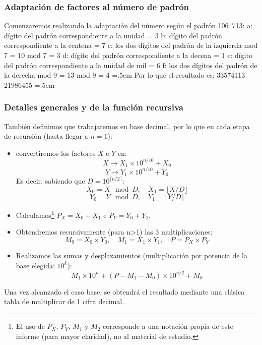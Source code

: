 \documentclass[titlepage,a4paper]{article}
\newenvironment{lcverbatim}
 {\SaveVerbatim{cverb}}
 {\endSaveVerbatim
  \flushleft\fboxrule=0pt\fboxsep=.5em
  \colorbox{cverbbg}{%
    \makebox[\dimexpr\linewidth-2\fboxsep][l]{\BUseVerbatim{cverb}}%
  }
  \endflushleft
}
\begin{document}
\subsubsection{Adaptación de factores al número de padrón}
Comenzaremos realizando la adaptación del número según el padrón 106~713:
\begin{lcverbatim}
    a: dígito del padrón correspondiente a la unidad = 3
    b: dígito del padrón correspondiente a la centena = 7
    c: los dos dígitos del padrón de la izquierda mod 7 = 10 mod 7 = 3
    d: dígito del padrón correspondiente a la decena = 1
    e: dígito del padrón correspondiente a la unidad de mil = 6
    f: los dos dígitos del padrón de la derecha mod 9 = 13 mod 9 = 4
\end{lcverbatim}
Por lo que el resultado es:
\begin{lcverbatim}
    33574113 
    21986455
\end{lcverbatim}
\subsubsection{Detalles generales y  de la función recursiva}
También definimos que trabajaremos en base decimal, por lo que en cada etapa de recursión (hasta llegar a $n=1$):
\begin{itemize}
    \item convertiremos los factores $X$ e $Y$ en:
    $$X \rightarrow X_1\times 10^{n/10}+X_0$$
    $$Y \rightarrow Y_1\times 10^{n/10}+Y_0$$
    Es decir, sabiendo que $D = 10^{\lceil n/2\rceil}$:
    $$X_0 = X \mod D, \quad X_1 = \lfloor X / D \rfloor$$
    $$Y_0 = Y \mod D, \quad Y_1 = \lfloor Y / D \rfloor$$
    \item Calculamos\footnote{El uso de $P_X$, $P_Y$, $M_1$ y $M_2$ corresponde a una notación propia de este informe (para mayor claridad), no al material de estudio.} $P_X=X_0+X_1$ e $P_Y=Y_0+Y_1$.
    \item Obtendremos recursivamente (para n>1) las 3 multiplicaciones\footnotemark[\value{footnote}]:
    $$M_0 = X_0\times Y_0,\quad M_1 = X_1\times Y_1,\quad P = P_X\times P_Y$$
    \item Realizamos las sumas y desplazamientos (multiplicación por potencia de la base elegida: $10^k$):
    $$M_1\times 10^n + (P-M_1-M_0)\times 10^{n/2} + M_0$$
\end{itemize}

Una vez alcanzado el caso base, se obtendrá el resultado mediante una clásica tabla de multiplicar de 1 cifra decimal.
\end{document}
